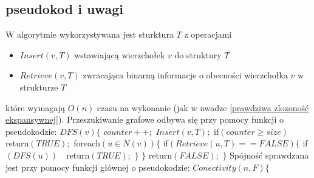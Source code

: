 \documentclass{pracamgr}
\begin{document}
   \subsection{pseudokod i uwagi}
    W algorytmie wykorzystywana jest sturktura $T$ z operacjami
    \begin{itemize}
     \item $Insert(v,T)$ wstawiającą wierzchołek $v$ do struktury $T$
     \item $Retrieve(v,T)$ zwracająca binarną informacje o obecności wierzchołka $v$ w strukturze $T$
    \end{itemize}
    które wymagają $O(n)$ czasu na wykonanie (jak w uwadze \ref{prawdziwa zlozoność ekspansywnej}).\newline
    Przeszukiwanie grafowe odbywa się przy pomocy funkcji o pseudokodzie:\newline\newline
    \hspace*{0pt}$DFS(v)\{$\newline
    \hspace*{16pt}	$counter++;$\newline
    \hspace*{16pt}	$Insert(v,T);$\newline
    \hspace*{16pt}	if$(counter\ge size)\quad $return$(TRUE);$\newline
    \hspace*{16pt}	foreach$(u\in N(v))\{$\newline
    \hspace*{32pt}		if$(Retrieve(u,T)==FALSE)\{$\newline
    \hspace*{48pt}			if$(DFS(u))\quad $return$(TRUE);$\newline
    \hspace*{32pt}		$\}$\newline
    \hspace*{16pt}	$\}$\newline
    \hspace*{16pt}	return$(FALSE);$\newline
    \hspace*{0pt}$\}$\newline  
    Spójność sprawdzana jest przy pomocy funkcji głównej o pseudokodzie:\newline\newline
    \hspace*{0pt}$Conectivity(n,F)\{$\newline
\end{document}
